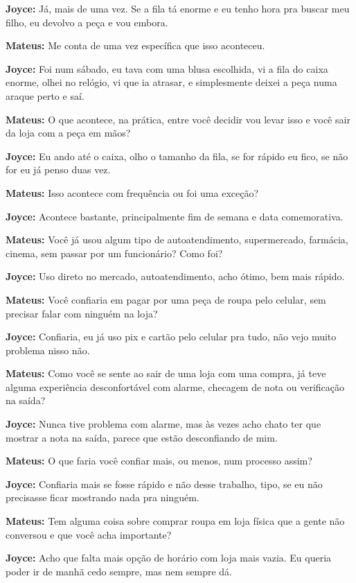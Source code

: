 \textbf{Joyce:} Já, mais de uma vez. Se a fila tá enorme e eu tenho hora pra buscar meu filho, eu devolvo a peça e vou embora.

\textbf{Mateus:} Me conta de uma vez específica que isso aconteceu.

\textbf{Joyce:} Foi num sábado, eu tava com uma blusa escolhida, vi a fila do caixa enorme, olhei no relógio, vi que ia atrasar, e simplesmente deixei a peça numa araque perto e saí.

\textbf{Mateus:} O que acontece, na prática, entre você decidir vou levar isso e você sair da loja com a peça em mãos?

\textbf{Joyce:} Eu ando até o caixa, olho o tamanho da fila, se for rápido eu fico, se não for eu já penso duas vez.

\textbf{Mateus:} Isso acontece com frequência ou foi uma exceção?

\textbf{Joyce:} Acontece bastante, principalmente fim de semana e data comemorativa.

\textbf{Mateus:} Você já usou algum tipo de autoatendimento, supermercado, farmácia, cinema, sem passar por um funcionário? Como foi?

\textbf{Joyce:} Uso direto no mercado, autoatendimento, acho ótimo, bem mais rápido.

\textbf{Mateus:} Você confiaria em pagar por uma peça de roupa pelo celular, sem precisar falar com ninguém na loja?

\textbf{Joyce:} Confiaria, eu já uso pix e cartão pelo celular pra tudo, não vejo muito problema nisso não.

\textbf{Mateus:} Como você se sente ao sair de uma loja com uma compra, já teve alguma experiência desconfortável com alarme, checagem de nota ou verificação na saída?

\textbf{Joyce:} Nunca tive problema com alarme, mas às vezes acho chato ter que mostrar a nota na saída, parece que estão desconfiando de mim.

\textbf{Mateus:} O que faria você confiar mais, ou menos, num processo assim?

\textbf{Joyce:} Confiaria mais se fosse rápido e não desse trabalho, tipo, se eu não precisasse ficar mostrando nada pra ninguém.

\textbf{Mateus:} Tem alguma coisa sobre comprar roupa em loja física que a gente não conversou e que você acha importante?

\textbf{Joyce:} Acho que falta mais opção de horário com loja mais vazia. Eu queria poder ir de manhã cedo sempre, mas nem sempre dá.

